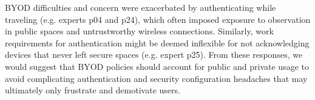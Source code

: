 BYOD difficulties and concern were exacerbated by authenticating while traveling (e.g. experts p04 and p24), which often imposed exposure to observation in public spaces and untrustworthy wireless connections. Similarly, work requirements for authentication might be deemed inflexible for not acknowledging devices that never left secure spaces (e.g. expert p25). %
From these responses, we would suggest that BYOD policies should account for public and private usage to avoid complicating authentication and security configuration headaches that may ultimately only frustrate and demotivate users.

